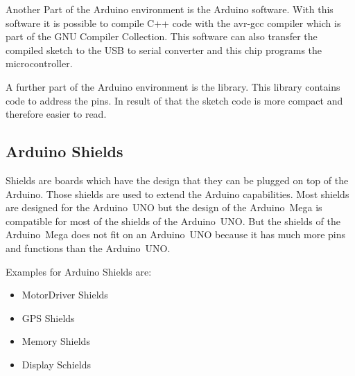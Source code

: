 Another Part of the Arduino environment is the Arduino software.
With this software it is possible to compile C++ code with the avr-gcc compiler which is part of the GNU Compiler Collection.
This software can also transfer the compiled sketch to the USB to serial converter and this chip programs the microcontroller.

A further part of the Arduino environment is the library.
This library contains code to address the pins.
In result of that the sketch code is more compact and therefore easier to read.


\subsection{Arduino Shields} \label{sec:arduinoShields}
Shields are boards which have the design that they can be plugged on top of the Arduino.
Those shields are used to extend the Arduino capabilities.
Most shields are designed for the Arduino~UNO but the design of the Arduino~Mega is compatible for most of the shields of the Arduino~UNO.
But the shields of the Arduino~Mega does not fit on an Arduino~UNO because it has much more pins and functions than the Arduino~UNO.

Examples for Arduino Shields are:
\begin{itemize}
\item MotorDriver Shields
\item GPS Shields
\item Memory Shields
\item Display Schields
\end{itemize}


